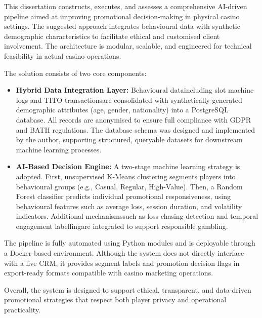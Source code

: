 \documentclass[12pt,a4paper]{report}
\begin{document}
This dissertation constructs, executes, and assesses a comprehensive AI-driven pipeline aimed at improving promotional decision-making in physical casino settings. The suggested approach integrates behavioural data with synthetic demographic characteristics to facilitate ethical and customised client involvement. The architecture is modular, scalable, and engineered for technical feasibility in actual casino operations.

The solution consists of two core components:

\begin{itemize}
    \item \textbf{Hybrid Data Integration Layer:} Behavioural dataincluding slot machine logs and TITO transactionsare consolidated with synthetically generated demographic attributes (age, gender, nationality) into a PostgreSQL database. All records are anonymised to ensure full compliance with GDPR and BATH regulations. The database schema was designed and implemented by the author, supporting structured, queryable datasets for downstream machine learning processes.
    
    \item \textbf{AI-Based Decision Engine:} A two-stage machine learning strategy is adopted. First, unsupervised K-Means clustering segments players into behavioural groups (e.g., Casual, Regular, High-Value). Then, a Random Forest classifier predicts individual promotional responsiveness, using behavioural features such as average loss, session duration, and volatility indicators. Additional mechanismssuch as loss-chasing detection and temporal engagement labellingare integrated to support responsible gambling.
\end{itemize}

The pipeline is fully automated using Python modules and is deployable through a Docker-based environment. Although the system does not directly interface with a live CRM, it provides segment labels and promotion decision flags in export-ready formats compatible with casino marketing operations.

Overall, the system is designed to support ethical, transparent, and data-driven promotional strategies that respect both player privacy and operational practicality.
\end{document}
